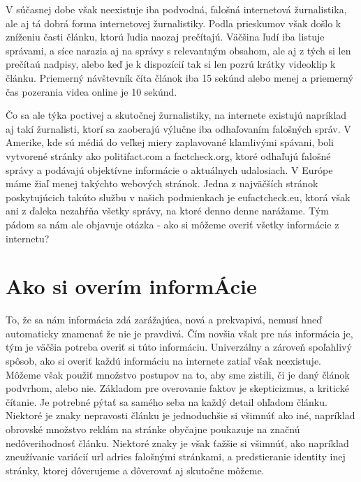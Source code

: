 \documentclass{sig-alternate}
\begin{document}
V súčasnej dobe však neexistuje iba podvodná, falošná internetová žurnalistika, ale aj tá dobrá forma internetovej žurnalistiky. Podla prieskumov však došlo k zníženiu časti článku, ktorú ľudia naozaj prečítajú. Väčšina ľudí iba listuje správami, a síce narazia aj na správy s relevantným obsahom, ale aj z tých si len prečítaú nadpisy, alebo keď je k dispozícií tak si len pozrú krátky videoklip k článku. Priemerný návštevník číta článok iba 15 sekúnd alebo menej a priemerný čas pozerania videa online je 10 sekúnd.

Čo sa ale týka poctivej a skutočnej žurnalistiky, na internete existujú napríklad aj takí žurnalisti, ktorí sa zaoberajú výlučne iba odhaľovaním falošných správ. V Amerike, kde sú médiá do veľkej miery zaplavované klamlivými spávani, boli vytvorené stránky ako politifact.com a factcheck.org, ktoré odhaľujú falošné správy a podávajú objektívne informácie o aktuálnych udalosiach.\cite{h} V Európe máme žiaľ menej takýchto webových stránok. Jedna z najväčších stránok poskytujúcich takúto službu v našich podmienkach je eufactcheck.eu, ktorá však ani z ďaleka nezahŕňa všetky správy, na ktoré denno denne narážame. Tým pádom sa nám ale objavuje otázka - ako si môžeme overiť všetky informácie z internetu?

\section{Ako si overím informÁcie}
To, že sa nám informácia zdá zarážajúca, nová a prekvapivá, nemusí hneď automaticky znamenať že nie je pravdivá. Čím novšia však pre nás informácia je, tým je väčšia potreba overiť si túto informáciu.
Univerzálny a zároveň spoľahlivý spôsob, ako si overiť každú informáciu na internete zatiaľ však neexistuje. Môžeme však použiť množstvo postupov na to, aby sme zistili, či je daný článok podvrhom, alebo nie. \cite{g} Základom pre overovanie faktov je skepticizmus, a kritické čítanie. Je potrebné pýtať sa samého seba na každý detail ohľadom článku. Niektoré je znaky nepravosti článku je jednoduchšie si všimnúť ako iné, napríklad obrovské množstvo reklám na stránke obyčajne poukazuje na značnú nedôverihodnosť článku. Niektoré znaky je však ťažšie si všimnúť, ako napríklad zneužívanie variácií url adries falošnými stránkami, a predstieranie identity inej stránky, ktorej dôverujeme a dôverovať aj skutočne môžeme.\cite{e}
\end{document}
